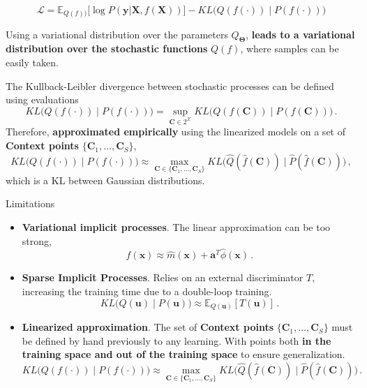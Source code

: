     \begin{frame}

        \[
        \mathcal{L} = \mathbb{E}_{Q(f))}\Big[ \log P(\mathbf y | \mathbf X, f(\mathbf X)) \Big] - KL\Big(Q(f(\cdot)) \mid P(f(\cdot)) \Big)
        \]
    
        Using a variational distribution over the parameters \(Q_{\bm \Theta}\), \textbf{leads to a variational distribution over the stochastic functions} \(Q(f)\), where samples can be easily taken.

        The Kullback-Leibler divergence between stochastic processes can be defined using evaluations
        \[
            KL\Big(Q(f(\cdot)) \mid P(f(\cdot)) \Big) = \sup_{\mathbf C \in 2^\mathcal{X}} KL\Big(Q(f(\mathbf C)) \mid P(f(\mathbf C)) \Big)\,.
        \]
        Therefore, \textbf{approximated empirically} using the linearized models on a set of \textbf{Context points} \(\{\mathbf C_1, \dots, \mathbf C_S\}\),
        \[
            KL\Big(Q(f(\cdot)) \mid P(f(\cdot)) \Big) \approx \max_{\mathbf C \in \{\mathbf C_1, \dots, \mathbf C_S\}} KL\Big(\hat{Q}(\hat{f}(\mathbf C)) \mid \hat{P}(\hat{f}(\mathbf C)) \Big)\,,
        \]
        which is a KL between Gaussian distributions.
    \end{frame}
    
    \begin{frame}{Limitations}
    \begin{itemize}
        \item \textbf{Variational implicit processes}. The linear approximation can be too strong,
        \[ 
            f(\mathbf x) \approx \hat{m}(\mathbf x) + \bm a^T \hat{\phi}(\mathbf x)\,.
        \]
        \item \textbf{Sparse Implicit Processes}. Relies on an external discriminator \(T\), increasing the training time due to a double-loop training.
        \[ 
             KL\Big(Q(\bm u) \mid P(\bm u) \Big) \approx \mathbb{E}_{Q(\bm u)}[T(\bm u)]\,.
        \]
        \item \textbf{Linearized approximation}. The set of \textbf{Context points} \(\{\mathbf C_1, \dots, \mathbf C_S\}\) must be defined by hand previously to any learning. With points both \textbf{in the training space and out of the training space} to ensure generalization.
        \[
            KL\Big(Q(f(\cdot)) \mid P(f(\cdot)) \Big) \approx \max_{\mathbf C \in \{\mathbf C_1, \dots, \mathbf C_S\}} KL\Big(\hat{Q}(\hat{f}(\mathbf C)) \mid \hat{P}(\hat{f}(\mathbf C) )\Big)\,.
        \]
    \end{itemize}
    \end{frame}